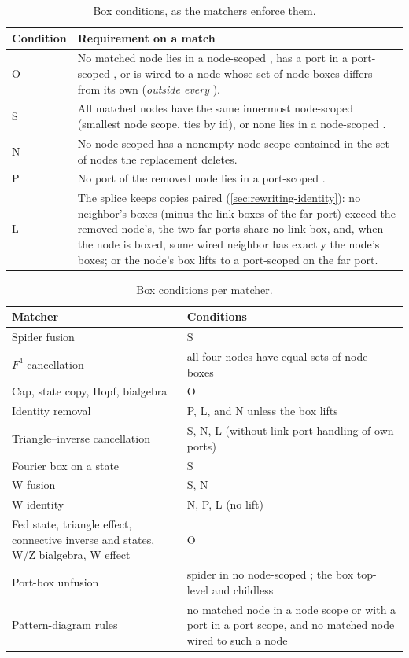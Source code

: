 \begin{table}[ht]
\centering\small
\caption{Box conditions, as the matchers enforce them.}\label{tab:rewriting-boxcond}
\begin{tabularx}{\textwidth}{@{}lX@{}}
\toprule
Condition & Requirement on a match \\
\midrule
O & No matched node lies in a node-scoped \bbox{}, has a port in a port-scoped \bbox{}, or is
wired to a node whose set of node boxes differs from its own (\emph{outside every \bbox{}}). \\
S & All matched nodes have the same innermost node-scoped \bbox{} (smallest node scope, ties by
id), or none lies in a node-scoped \bbox{}. \\
N & No node-scoped \bbox{} has a nonempty node scope contained in the set of nodes the
replacement deletes. \\
P & No port of the removed node lies in a port-scoped \bbox{}. \\
L & The splice keeps copies paired (\cref{sec:rewriting-identity}): no neighbor's boxes (minus the
link boxes of the far port) exceed the removed node's, the two far ports share no link box, and,
when the node is boxed, some wired neighbor has exactly the node's boxes; or the node's box
lifts to a port-scoped \bbox{} on the far port. \\
\bottomrule
\end{tabularx}
\end{table}

\begin{table}[ht]
\centering\small
\caption{Box conditions per matcher.}\label{tab:rewriting-boxrules}
\begin{tabularx}{\textwidth}{@{}>{\raggedright\arraybackslash}p{}>{\raggedright\arraybackslash}X@{}}
\toprule
Matcher & Conditions \\
\midrule
Spider fusion & S \\
$F^4$ cancellation & all four nodes have equal sets of node boxes \\
Cap, state copy, Hopf, bialgebra & O \\
Identity removal & P, L, and N unless the box lifts \\
Triangle--inverse cancellation & S, N, L (without link-port handling of own ports) \\
Fourier box on a state & S \\
W fusion & S, N \\
W identity & N, P, L (no lift) \\
Fed state, triangle effect, connective inverse and states, W/Z bialgebra, W effect & O \\
Port-box unfusion & spider in no node-scoped \bbox{}; the box top-level and childless \\
Pattern-diagram rules & no matched node in a node scope or with a port in a port scope, and no
matched node wired to such a node \\
\bottomrule
\end{tabularx}
\end{table}

